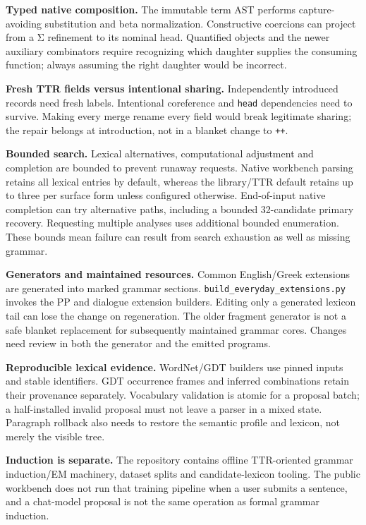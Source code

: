 \documentclass[11pt,a4paper]{article}
\begin{document}
\textbf{Typed native composition.} The immutable term AST performs
capture-avoiding substitution and beta normalization. Constructive
coercions can project from a Σ refinement to its nominal head.
Quantified objects and the newer auxiliary combinators require
recognizing which daughter supplies the consuming function; always
assuming the right daughter would be incorrect.

\textbf{Fresh TTR fields versus intentional sharing.} Independently
introduced records need fresh labels. Intentional coreference and
\texttt{head} dependencies need to survive. Making every merge rename
every field would break legitimate sharing; the repair belongs at
introduction, not in a blanket change to \texttt{++}.

\textbf{Bounded search.} Lexical alternatives, computational adjustment
and completion are bounded to prevent runaway requests. Native workbench
parsing retains all lexical entries by default, whereas the library/TTR
default retains up to three per surface form unless configured
otherwise. End-of-input native completion can try alternative paths,
including a bounded 32-candidate primary recovery. Requesting multiple
analyses uses additional bounded enumeration. These bounds mean failure
can result from search exhaustion as well as missing grammar.

\textbf{Generators and maintained resources.} Common English/Greek
extensions are generated into marked grammar sections.
\nolinkurl{build_everyday_extensions.py} invokes the PP and dialogue
extension builders. Editing only a generated lexicon tail can lose the
change on regeneration. The older fragment generator is not a safe
blanket replacement for subsequently maintained grammar cores. Changes
need review in both the generator and the emitted programs.

\textbf{Reproducible lexical evidence.} WordNet/GDT builders use pinned
inputs and stable identifiers. GDT occurrence frames and inferred
combinations retain their provenance separately. Vocabulary validation
is atomic for a proposal batch; a half-installed invalid proposal must
not leave a parser in a mixed state. Paragraph rollback also needs to
restore the semantic profile and lexicon, not merely the visible tree.

\textbf{Induction is separate.} The repository contains offline
TTR-oriented grammar induction/EM machinery, dataset splits and
candidate-lexicon tooling. The public workbench does not run that
training pipeline when a user submits a sentence, and a chat-model
proposal is not the same operation as formal grammar induction.
\end{document}
